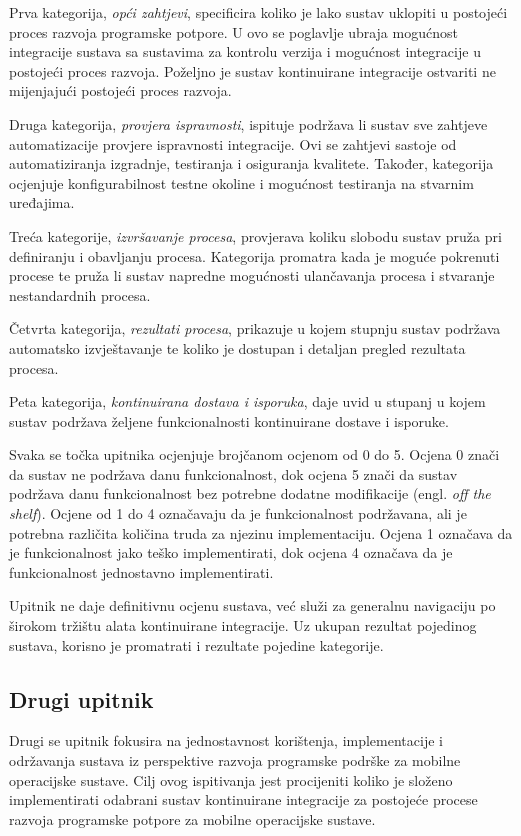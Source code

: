 \documentclass[times, utf8, diplomski, numeric]{fer}
\newcommand{\eng}[1]{(engl. \textit{#1})}
\begin{document}
Prva kategorija, \textit{opći zahtjevi}, specificira koliko je lako sustav uklopiti u postojeći proces razvoja programske potpore. U ovo se poglavlje ubraja mogućnost integracije sustava sa sustavima za kontrolu verzija i mogućnost integracije u postojeći proces razvoja. Poželjno je sustav kontinuirane integracije ostvariti ne mijenjajući postojeći proces razvoja.

Druga kategorija, \textit{provjera ispravnosti}, ispituje podržava li sustav sve zahtjeve automatizacije provjere ispravnosti integracije. Ovi se zahtjevi sastoje od automatiziranja izgradnje, testiranja i osiguranja kvalitete. Također, kategorija ocjenjuje konfigurabilnost testne okoline i mogućnost testiranja na stvarnim uređajima.

Treća kategorije, \textit{izvršavanje procesa}, provjerava koliku slobodu sustav pruža pri definiranju i obavljanju procesa. Kategorija promatra kada je moguće pokrenuti procese te pruža li sustav napredne mogućnosti ulančavanja procesa i stvaranje nestandardnih procesa.

Četvrta kategorija, \textit{rezultati procesa}, prikazuje u kojem stupnju sustav podržava automatsko izvještavanje te koliko je dostupan i detaljan pregled rezultata procesa.

Peta kategorija, \textit{kontinuirana dostava i isporuka}, daje uvid u stupanj u kojem sustav podržava željene funkcionalnosti kontinuirane dostave i isporuke.

Svaka se točka upitnika ocjenjuje brojčanom ocjenom od 0 do 5. Ocjena 0 znači da sustav ne podržava danu funkcionalnost, dok ocjena 5 znači da sustav podržava danu funkcionalnost bez potrebne dodatne modifikacije \eng{off the shelf}. Ocjene od 1 do 4 označavaju da je funkcionalnost podržavana, ali je potrebna različita količina truda za njezinu implementaciju. Ocjena 1 označava da je funkcionalnost jako teško implementirati, dok ocjena 4 označava da je funkcionalnost jednostavno implementirati.

Upitnik ne daje definitivnu ocjenu sustava, već služi za generalnu navigaciju po širokom tržištu alata kontinuirane integracije. Uz ukupan rezultat pojedinog sustava, korisno je promatrati i rezultate pojedine kategorije.

\subsection{Drugi upitnik}
Drugi se upitnik fokusira na jednostavnost korištenja, implementacije i održavanja sustava iz perspektive razvoja programske podrške za mobilne operacijske sustave. Cilj ovog ispitivanja jest procijeniti koliko je složeno implementirati odabrani sustav kontinuirane integracije za postojeće procese razvoja programske potpore za mobilne operacijske sustave.
\end{document}
